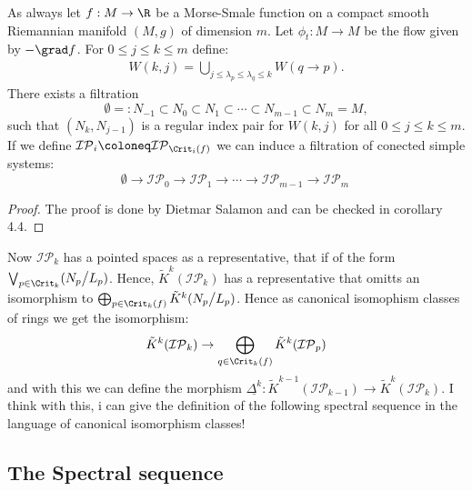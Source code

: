 \begin{definition} \label{def: Regular index pairs and a filtration on M } \label{def: Regular index pairs and a filtration on M}
	As always let $f:M\to \R$ be a Morse-Smale function on a compact smooth Riemannian manifold $(M,g)$ of dimension $m$. Let $\phi_t:M\to M$ be the flow given by $-\grad f$. For $0\leq j\leq k\leq m$ define:
	\begin{align*}
		W(k,j)=\bigcup_{j\leq \lambda_p \leq \lambda_q\leq k} W(q \to p).
	\end{align*}There exists a filtration
	\begin{equation} \label{eq: Filtration conley}
		\emptyset=:N_{-1}\subset N_0\subset N_1\subset \cdots \subset N_{m-1}\subset N_m=M,
	\end{equation} such that $(N_k,N_{j-1})$ is a regular index pair for $W(k,j)$ for all $0\leq j \leq k\leq m$. If we define $\mathcal{IP}_i\coloneq \mathcal{IP}_{\Crit_i(f)}$ we can induce a filtration of conected simple systems:
	\begin{equation*}
		\emptyset \to \mathcal{IP}_0\to \mathcal{IP}_1 \to \cdots \to \mathcal{IP}_{m-1} \to \mathcal{IP}_m \
	\end{equation*} 
\end{definition}
\begin{proof}
	The proof is done by Dietmar Salamon and can be checked in \cite{Salamon1985} corollary 4.4. 
\end{proof}
\begin{remark}
	Now $\mathcal{IP}_k$ has a pointed spaces as a representative, that if of the form $\bigvee_{p\in \Crit_k}(N_p\big/L_p)$. Hence, $\tilde{K}^k(\mathcal{IP}_k)$ has a representative that omitts an isomorphism to $\bigoplus_{p\in \Crit_k(f)}\tilde{K}^k(N_p\big/L_p)$. Hence as canonical isomophism classes of rings we get the isomorphism:
	\begin{equation*}
		\tilde{K}^k(\mathcal{IP}_k)\to \bigoplus_{q\in \Crit_k(f)}\tilde{K}^k(\mathcal{IP}_p)
	\end{equation*} and with this we can define the morphism $\underline{\Delta^k}:	\tilde{K}^{k-1}(\mathcal{IP}_{k-1})\to 	\tilde{K}^k(\mathcal{IP}_k)$.
	I think with this, i can give the definition of the following spectral sequence in the language of canonical isomorphism classes!
\end{remark}
\subsection{The Spectral sequence}

